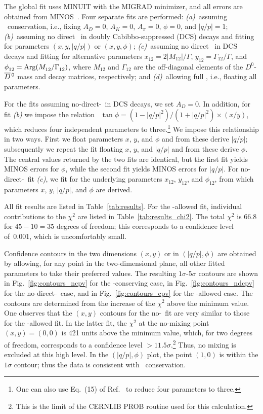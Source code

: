 The global fit uses MINUIT with the MIGRAD minimizer, 
and all errors are obtained from MINOS~\cite{MINUIT:webpage}. 
Four separate fits are performed: 
{\it (a)}\ assuming \cp\ conservation, i.e., fixing
$A^{}_D\!=\!0$, $A_K\!=\!0$, $A^{}_\pi\!=\!0$, $\phi\!=\!0$, 
and $|q/p|\!=\!1$;
{\it (b)}\ assuming no direct \cpv\ in doubly Cabibbo-suppressed (DCS)
decays and fitting for parameters $(x,y,|q/p|)$ or $(x,y,\phi)$; 
{\it (c)}\ assuming no direct \cpv\ in DCS decays and fitting for
alternative parameters $x^{}_{12}= 2|M^{}_{12}|/\Gamma$, 
$y^{}_{12}= \Gamma^{}_{12}/\Gamma$, and 
$\phi^{}_{12}= {\rm Arg}(M^{}_{12}/\Gamma^{}_{12})$,
where $M^{}_{12}$ and $\Gamma^{}_{12}$ are the off-diagonal
elements of the $D^0$-$\overline{D}{}^{\,0}$ mass and decay matrices, respectively; and
{\it (d)}\ allowing full \cpv, i.e., floating all parameters. 

For the fits assuming no-direct-\cpv\ in DCS decays, 
we set $A^{}_D\!=\!0$. In addition, for fit 
{\it (b)\/} we impose the relation~\cite{Ciuchini:2007cw,Kagan:2009gb}
$\tan\phi = (1-|q/p|^2)/(1+|q/p|^2)\times (x/y)$, which reduces 
four independent parameters to 
three.\footnote{One can also use Eq.~(15) of Ref.~\cite{Grossman:2009mn}
to reduce four parameters to three.} 
We impose this relationship in two ways. First we float parameters
$x$, $y$, and $\phi$ and from these derive $|q/p|$; subsequently we
repeat the fit floating $x$, $y$, and $|q/p|$ and from these derive 
$\phi$. The central values returned by the two fits are identical,
but the first fit yields MINOS errors for $\phi$, while the second
fit yields MINOS errors for $|q/p|$. For no-direct-\cpv\ fit 
{\it (c)}, we fit for the underlying parameters $x^{}_{12}$, $y^{}_{12}$, 
and $\phi^{}_{12}$, from which parameters $x$, $y$, $|q/p|$, and $\phi$ 
are derived. 

All fit results are listed in 
Table~\ref{tab:results}. For the \cpv-allowed fit,
individual contributions to the $\chi^2$ are listed 
in Table~\ref{tab:results_chi2}. The total $\chi^2$ 
is 66.8 for $45-10=35$ degrees of freedom; this 
corresponds to a confidence level of~0.001,
which is uncomfortably small.

Confidence contours in the two dimensions $(x,y)$ or 
in $(|q/p|,\phi)$ are obtained by allowing, for any point in the
two-dimensional plane, all other fitted parameters to take their 
preferred values. The resulting $1\sigma$-$5\sigma$ contours 
are shown 
in Fig.~\ref{fig:contours_ncpv} for the \cp-conserving case, 
in Fig.~\ref{fig:contours_ndcpv} for the no-direct-\cpv\ case, 
and in Fig.~\ref{fig:contours_cpv} for the \cpv-allowed 
case. The contours are determined from the increase of the
$\chi^2$ above the minimum value.
One observes that the $(x,y)$ contours for the no-\cpv\ fit 
are very similar to those for the \cpv-allowed fit. In the latter
fit, the $\chi^2$ at the no-mixing point $(x,y)\!=\!(0,0)$ is 421
units above the minimum value, which, for two degrees of freedom,
corresponds to a confidence level $>11.5\sigma$.\footnote{This is
the limit of the CERNLIB PROB routine used for this calculation.}
Thus, no mixing is excluded at this high level. In the $(|q/p|,\phi)$
plot, the point $(1,0)$ is within the $1\sigma$ contour; thus the
data is consistent with \cp\ conservation.

